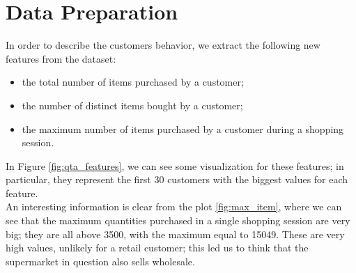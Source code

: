 \section{Data Preparation}

In order to describe the customers behavior, we extract the following new features from the dataset:
\begin{itemize}
\item the total number of items purchased by a customer;
\item the number of distinct items bought by a customer;
\item the maximum number of items purchased by a customer during a shopping session.
\end{itemize}

In Figure \ref{fig:qta_features}, we can see some visualization for these features; in particular, they represent the first 30 customers with the biggest values for each feature.\\
An interesting information is clear from the plot \ref{fig:max_item}, where we can see that the maximum quantities purchased in a single shopping session are very big; they are all above 3500, with the maximum equal to 15049. These are very high values, unlikely for a retail customer; this led us to think that the supermarket in question also sells wholesale.

